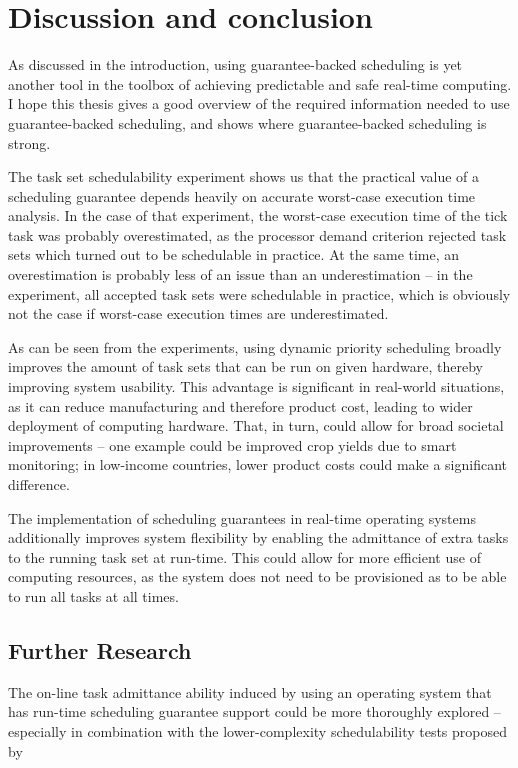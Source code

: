 \chapter{Discussion and conclusion}
As discussed in the introduction, using guarantee-backed scheduling is yet another tool in the toolbox of achieving predictable and safe real-time computing. I hope this thesis gives a good overview of the required information needed to use guarantee-backed scheduling, and shows where guarantee-backed scheduling is strong.

The task set schedulability experiment shows us that the practical value of a scheduling guarantee depends heavily on accurate worst-case execution time analysis. In the case of that experiment, the worst-case execution time of the \ucos tick task was probably overestimated, as the processor demand criterion rejected task sets which turned out to be schedulable in practice. At the same time, an overestimation is probably less of an issue than an underestimation -- in the experiment, all accepted task sets were schedulable in practice, which is obviously not the case if worst-case execution times are underestimated.

As can be seen from the experiments, using dynamic priority scheduling broadly improves the amount of task sets that can be run on given hardware, thereby improving system usability. This advantage is significant in real-world situations, as it can reduce manufacturing and therefore product cost, leading to wider deployment of computing hardware. That, in turn, could allow for broad societal improvements -- one example could be improved crop yields due to smart monitoring; in low-income countries, lower product costs could make a significant difference.

The implementation of scheduling guarantees in real-time operating systems additionally improves system flexibility by enabling the admittance of extra tasks to the running task set at run-time. This could allow for more efficient use of computing resources, as the system does not need to be provisioned as to be able to run all tasks at all times.

\section{Further Research}
The on-line task admittance ability induced by using an operating system that has run-time scheduling guarantee support could be more thoroughly explored -- especially in combination with the lower-complexity schedulability tests proposed by \textcite{Albers}


